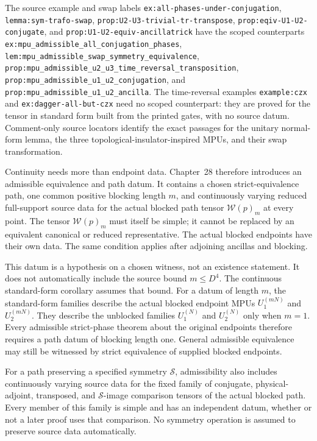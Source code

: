 \documentclass{article}
\begin{document}
The source example and swap labels
\texttt{ex:all-phases-under-conjugation}, \texttt{lemma:sym-trafo-swap},
\texttt{prop:U2-U3-trivial-tr-transpose},
\texttt{prop:eqiv-U1-U2-conjugate}, and
\texttt{prop:U1-U2-equiv-ancillatrick} have the scoped counterparts
\texttt{ex:mpu\_admissible\_all\_conjugation\_phases},
\texttt{lem:mpu\_admissible\_swap\_symmetry\_equivalence},
\texttt{prop:mpu\_admissible\_u2\_u3\_time\_reversal\_transposition},
\texttt{prop:mpu\_admissible\_u1\_u2\_conjugation}, and
\texttt{prop:mpu\_admissible\_u1\_u2\_ancilla}. The time-reversal examples
\texttt{example:czx} and \texttt{ex:dagger-all-but-czx} need no scoped
counterpart: they are proved for the tensor in standard form built from the
printed gates, with no source datum. Comment-only source
locators identify the exact passages for the unitary normal-form lemma, the
three topological-insulator-inspired MPUs, and their swap transformation.

Continuity needs more than endpoint data. Chapter~28 therefore introduces an
admissible equivalence and path datum. It contains a chosen strict-equivalence
path, one common positive blocking length $m$, and continuously varying reduced
full-support source data for the actual blocked path tensor
$\mathcal W(p)_m$ at every point. The tensor $\mathcal W(p)_m$ must itself be
simple; it cannot be replaced by an equivalent canonical or reduced
representative. The actual blocked endpoints have their own data. The same
condition applies after adjoining ancillas and blocking.

This datum is a hypothesis on a chosen witness, not an existence statement. It
does not automatically include the source bound $m\leq D^4$. The continuous
standard-form corollary assumes that bound. For a datum of length $m$, the
standard-form families describe the actual blocked endpoint MPUs
$U_1^{(mN)}$ and $U_2^{(mN)}$. They describe the unblocked families
$U_1^{(N)}$ and $U_2^{(N)}$ only when $m=1$. Every admissible strict-phase
theorem about the original endpoints therefore requires a path datum of
blocking length one. General admissible equivalence may still be witnessed by
strict equivalence of supplied blocked endpoints.

For a path preserving a specified symmetry $\mathcal S$, admissibility also
includes continuously varying source data for the fixed family of conjugate,
physical-adjoint, transposed, and $\mathcal S$-image comparison tensors of the
actual blocked path. Every member of this family is simple and has an
independent datum, whether or not a later proof uses that comparison. No
symmetry operation is assumed to preserve source data automatically.
\end{document}

